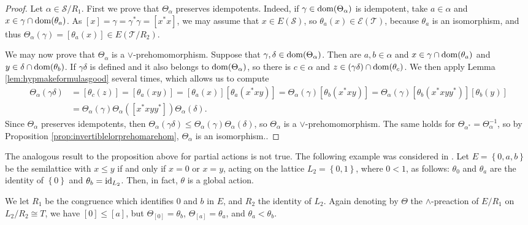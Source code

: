 \begin{proof}
    Let $\alpha\in\mathcal{S}/R_1$. First we prove that $\Theta_\alpha$ preserves idempotents. Indeed, if $\gamma\in\operatorname{dom}(\Theta_\alpha)$ is idempotent, take $a\in\alpha$ and $x\in\gamma\cap\operatorname{dom}(\theta_a)$. As $[x]=\gamma=\gamma^*\gamma=[x^*x]$, we may assume that $x\in E(\mathcal{S})$, so $\theta_a(x)\in\mathcal{E}(\mathcal{T})$, because $\theta_a$ is an isomorphism, and thus $\Theta_\alpha(\gamma)=[\theta_a(x)]\in E(\mathcal{T}/R_2)$.
    
    We may now prove that $\Theta_{\alpha}$ is a $\lor$-prehomomorphism. Suppose that $\gamma,\delta\in\operatorname{dom}(\Theta_\alpha)$. Then are $a,b\in\alpha$ and $x\in\gamma\cap\operatorname{dom}(\theta_a)$ and $y\in\delta\cap\operatorname{dom}(\theta_b)$. If $\gamma\delta$ is defined and it also belongs to $\operatorname{dom}(\Theta_\alpha)$, so there is $c\in\alpha$ and $z\in(\gamma\delta)\cap\operatorname{dom}(\theta_c)$. We then apply Lemma \ref{lem:hypmakeformulasgood} several times, which allows us to compute
    \begin{align*}
        \Theta_\alpha(\gamma\delta)&=[\theta_c(z)]=[\theta_a(xy)]=[\theta_a(x)][\theta_a(x^*xy)]=\Theta_\alpha(\gamma)[\theta_b(x^*xy)]=\Theta_\alpha(\gamma)[\theta_b(x^*xyy^*)][\theta_b(y)]\\
        &=\Theta_\alpha(\gamma)\Theta_\alpha([x^*xyy^*])\Theta_\alpha(\delta).
    \end{align*}
    Since $\Theta_\alpha$ preserves idempotents, then $\Theta_\alpha(\gamma\delta)\leq\Theta_\alpha(\gamma)\Theta_\alpha(\delta)$, so $\Theta_\alpha$ is a $\lor$-prehomomorphism. The same holds for $\Theta_{\alpha^*}=\Theta_\alpha^{-1}$, so by Proposition \ref{prop:invertiblelorprehomarehom}, $\Theta_\alpha$ is an isomorphism.\qedhere.
\end{proof}

\begin{remark}
    The analogous result to the proposition above for partial actions is not true. The following example was considered in \cite[Example 4.5]{Mikola2017}. Let $E=\left\{0,a,b\right\}$ be the semilattice with $x\leq y$ if and only if $x=0$ or $x=y$, acting on the lattice $L_2=\left\{0,1\right\}$, where $0<1$, as follows: $\theta_0$ and $\theta_a$ are the identity of $\left\{0\right\}$ and $\theta_b=\operatorname{id}_{L_2}$. Then, in fact, $\theta$ is a global action.
    
    We let $R_1$ be the congruence which identifies $0$ and $b$ in $E$, and $R_2$ the identity of $L_2$. Again denoting by $\Theta$ the $\land$-preaction of $E/R_1$ on $L_2/R_2\cong T$, we have $[0]\leq[a]$, but $\Theta_{[0]}=\theta_b$, $\Theta_{[a]}=\theta_a$, and $\theta_a<\theta_b$.
\end{remark}

